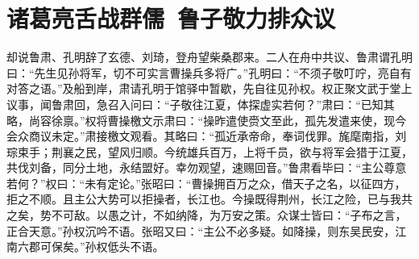 \chapter{诸葛亮舌战群儒~鲁子敬力排众议}

却说鲁肃、孔明辞了玄德、刘琦，登舟望柴桑郡来。二人在舟中共议、鲁肃谓孔明曰：“先生见孙将军，切不可实言曹操兵多将广。”孔明曰：“不须子敬叮咛，亮自有对答之语。”及船到岸，肃请孔明于馆驿中暂歇，先自往见孙权。权正聚文武于堂上议事，闻鲁肃回，急召入问曰：“子敬往江夏，体探虚实若何？”肃曰：“已知其略，尚容徐禀。”权将曹操檄文示肃曰：“操昨遣使赍文至此，孤先发遣来使，现今会众商议未定。”肃接檄文观看。其略曰：“孤近承帝命，奉词伐罪。旄麾南指，刘琮束手；荆襄之民，望风归顺。今统雄兵百万，上将千员，欲与将军会猎于江夏，共伐刘备，同分土地，永结盟好。幸勿观望，速赐回音。”鲁肃看毕曰：“主公尊意若何？”权曰：“未有定论。”张昭曰：“曹操拥百万之众，借天子之名，以征四方，拒之不顺。且主公大势可以拒操者，长江也。今操既得荆州，长江之险，已与我共之矣，势不可敌。以愚之计，不如纳降，为万安之策。众谋士皆曰：“子布之言，正合天意。”孙权沉吟不语。张昭又曰：“主公不必多疑。如降操，则东吴民安，江南六郡可保矣。”孙权低头不语。

